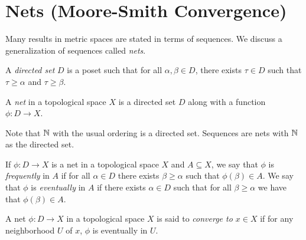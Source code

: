 \documentclass[letterpaper, 11pt]{article}
\begin{document}
\clearpage

\section{Nets (Moore-Smith Convergence)}

Many results in metric spaces are stated in terms of sequences.
We discuss a generalization of sequences called \emph{nets}.

\begin{defn}
  A \emph{directed set} $D$ is a poset such that for all $\alpha, \beta \in D$, there exists $\tau \in D$ such that $\tau \geq \alpha$ and $\tau \geq \beta$.
\end{defn}

\begin{defn}[Net]
  A \emph{net} in a topological space $X$ is a directed set $D$ along with a function $\phi\colon D \to X$.
\end{defn}

\begin{ex}
  Note that $\mathbb{N}$ with the usual ordering is a directed set.
  Sequences are nets with $\mathbb{N}$ as the directed set.
\end{ex}

\begin{defn}
  If $\phi\colon D \to X$ is a net in a topological space $X$ and $A \subseteq X$, we say that $\phi$ is \emph{frequently} in $A$ if for all $\alpha \in D$ there exists $\beta \geq \alpha$ such that $\phi(\beta) \in A$.
  We say that $\phi$ is \emph{eventually} in $A$ if there exists $\alpha \in D$ such that for all $\beta \geq \alpha$ we have that $\phi(\beta) \in A$.
\end{defn}

\begin{defn}
  A net $\phi\colon D \to X$ in a topological space $X$ is said to \emph{converge to $x \in X$} if for any neighborhood $U$ of $x$, $\phi$ is eventually in $U$.
\end{defn}
\end{document}
